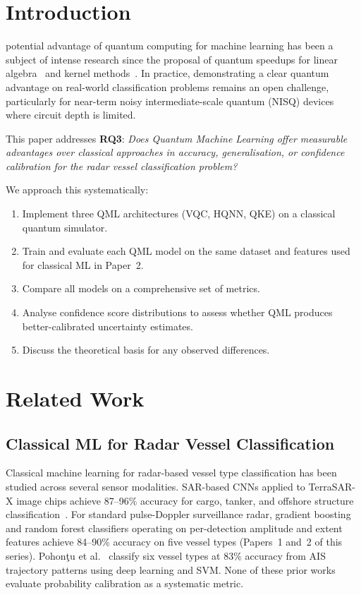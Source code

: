 \documentclass[journal]{IEEEtran}
\begin{document}
\section{Introduction}

 potential advantage of quantum computing for machine
learning has been a subject of intense research since the proposal of quantum
speedups for linear
algebra~\cite{harrow2009} and kernel methods~\cite{havlicek2019supervised}.
In practice, demonstrating a clear quantum advantage on real-world classification
problems remains an open challenge, particularly for near-term noisy
intermediate-scale quantum (NISQ) devices where circuit depth is limited.

This paper addresses \textbf{RQ3}: \textit{Does Quantum Machine Learning offer
measurable advantages over classical approaches in accuracy, generalisation,
or confidence calibration for the radar vessel classification problem?}

We approach this systematically:
\begin{enumerate}
  \item Implement three QML architectures (VQC, HQNN, QKE) on a classical
        quantum simulator.
  \item Train and evaluate each QML model on the same dataset and features
        used for classical ML in Paper~2.
  \item Compare all models on a comprehensive set of metrics.
  \item Analyse confidence score distributions to assess whether QML produces
        better-calibrated uncertainty estimates.
  \item Discuss the theoretical basis for any observed differences.
\end{enumerate}

\section{Related Work}
\label{sec:relatedwork}

\subsection{Classical ML for Radar Vessel Classification}

Classical machine learning for radar-based vessel type classification has been studied across several sensor modalities. SAR-based CNNs applied to TerraSAR-X image chips achieve 87--96\% accuracy for cargo, tanker, and offshore structure classification~\cite{bentes2017sar}. For standard pulse-Doppler surveillance radar, gradient boosting and random forest classifiers operating on per-detection amplitude and extent features achieve 84--90\% accuracy on five vessel types (Papers~1 and~2 of this series). Pohon\c{t}u et al.~\cite{pohontzu2023trajectory} classify six vessel types at 83\% accuracy from AIS trajectory patterns using deep learning and SVM. None of these prior works evaluate probability calibration as a systematic metric.
\end{document}
